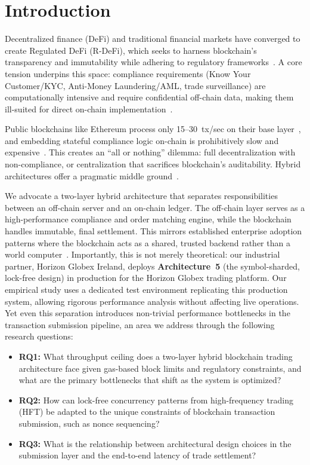\section{Introduction}
\label{sec:intro}

Decentralized finance (DeFi) and traditional financial markets have converged to create Regulated DeFi (R-DeFi), which seeks to harness blockchain's transparency and immutability while adhering to regulatory frameworks~\cite{zetzsche2020defi,jamithireddy2025hybrid}. A core tension underpins this space: compliance requirements (Know Your Customer/KYC, Anti-Money Laundering/AML, trade surveillance) are computationally intensive and require confidential off-chain data, making them ill-suited for direct on-chain implementation~\cite{sak2024kyc,wolfsberg2022framework}.

Public blockchains like Ethereum process only 15--30~tx/sec on their base layer~\cite{schaffer2019performance,xu2021slimchain}, and embedding stateful compliance logic on-chain is prohibitively slow and expensive~\cite{eren2025onchain}. This creates an ``all or nothing'' dilemma: full decentralization with non-compliance, or centralization that sacrifices blockchain's auditability. Hybrid architectures offer a pragmatic middle ground~\cite{zhu2026hybrid}.

We advocate a two-layer hybrid architecture that separates responsibilities between an off-chain server and an on-chain ledger. The off-chain layer serves as a high-performance compliance and order matching engine, while the blockchain handles immutable, final settlement. This mirrors established enterprise adoption patterns where the blockchain acts as a shared, trusted backend rather than a world computer~\cite{jamithireddy2025hybrid}. Importantly, this is not merely theoretical: our industrial partner, Horizon Globex Ireland, deploys \textbf{Architecture~5} (the symbol-sharded, lock-free design) in production for the Horizon Globex trading platform. Our empirical study uses a dedicated test environment replicating this production system, allowing rigorous performance analysis without affecting live operations. Yet even this separation introduces non-trivial performance bottlenecks in the transaction submission pipeline, an area we address through the following research questions:

\begin{itemize}
    \item \textbf{RQ1:} What throughput ceiling does a two-layer hybrid blockchain trading architecture face given gas-based block limits and regulatory constraints, and what are the primary bottlenecks that shift as the system is optimized?
    \item \textbf{RQ2:} How can lock-free concurrency patterns from high-frequency trading (HFT) be adapted to the unique constraints of blockchain transaction submission, such as nonce sequencing?
    \item \textbf{RQ3:} What is the relationship between architectural design choices in the submission layer and the end-to-end latency of trade settlement?
\end{itemize}

